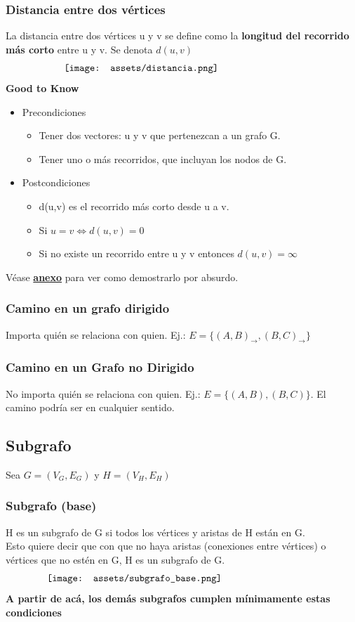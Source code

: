 \documentclass[10pt,a4paper]{article}
\begin{document}
\subsubsection*{Distancia entre dos vértices}
La distancia entre dos vértices u y v se define como la \textbf{longitud del recorrido más corto} entre u y v. Se denota $d(u,v)$ 
\[\begin{minipage}[b]{0.7\textwidth}
    \texttt{[image: assets/distancia.png]}
\end{minipage}\]
\textbf{Good to Know} 
\begin{itemize}
    \item Precondiciones
    \begin{itemize}
        \item Tener dos vectores: u y v que pertenezcan a un grafo G.
        \item Tener uno o más recorridos, que incluyan los nodos de G.
    \end{itemize}
    \item Postcondiciones
    \begin{itemize}
        \item d(u,v) es el recorrido más corto desde u a v.
        \item Si $u=v \iff d(u,v) = 0$
        \item Si no existe un recorrido entre u y v entonces $d(u,v) = \infty$
    \end{itemize}
\end{itemize}
Véase \hyperref[subsubsec:distancia_demostracion]{\textbf{anexo}} para ver como demostrarlo por absurdo.
\subsubsection*{Camino en un grafo dirigido}
Importa quién se relaciona con quien. Ej.: $E = \{(A, B)_{\rightarrow}, (B, C)_{\rightarrow}\}$
\subsubsection*{Camino en un Grafo no Dirigido}
No importa quién se relaciona con quien. Ej.: $E = \{(A, B), (B, C)\}$. El camino podría ser en cualquier sentido. 
\subsection*{Subgrafo}
Sea $G = (V_{G}, E_{G})$ y $H = (V_{H}, E_{H})$ 
\subsubsection*{Subgrafo (base)}
H es un subgrafo de G si todos los vértices y aristas de H están en G. \\
Esto quiere decir que con que no haya aristas (conexiones entre vértices) o vértices que no estén en G, H es un subgrafo de G.
\[\begin{minipage}[b]{0.8\textwidth}
    \texttt{[image: assets/subgrafo\_base.png]}
\end{minipage}\]
\textbf{A partir de acá, los demás subgrafos cumplen mínimamente estas condiciones}
\end{document}
